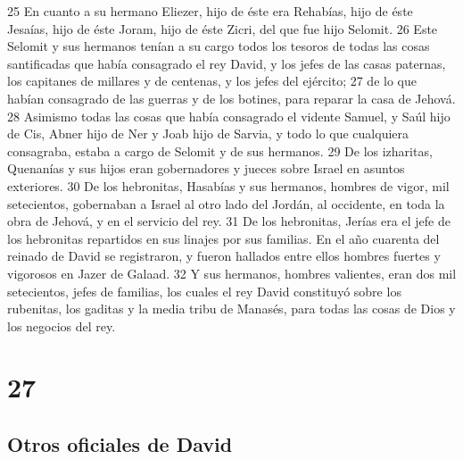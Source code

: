 25 En cuanto a su hermano Eliezer, hijo de éste era Rehabías, hijo de éste Jesaías, hijo de éste Joram, hijo de éste Zicri, del que fue hijo Selomit.
26 Este Selomit y sus hermanos tenían a su cargo todos los tesoros de todas las cosas santificadas que había consagrado el rey David, y los jefes de las casas paternas, los capitanes de millares y de centenas, y los jefes del ejército;
27 de lo que habían consagrado de las guerras y de los botines, para reparar la casa de Jehová.
28 Asimismo todas las cosas que había consagrado el vidente Samuel, y Saúl hijo de Cis, Abner hijo de Ner y Joab hijo de Sarvia, y todo lo que cualquiera consagraba, estaba a cargo de Selomit y de sus hermanos.
29 De los izharitas, Quenanías y sus hijos eran gobernadores y jueces sobre Israel en asuntos exteriores.
30 De los hebronitas, Hasabías y sus hermanos, hombres de vigor, mil setecientos, gobernaban a Israel al otro lado del Jordán, al occidente, en toda la obra de Jehová, y en el servicio del rey.
31 De los hebronitas, Jerías era el jefe de los hebronitas repartidos en sus linajes por sus familias. En el año cuarenta del reinado de David se registraron, y fueron hallados entre ellos hombres fuertes y vigorosos en Jazer de Galaad.
32 Y sus hermanos, hombres valientes, eran dos mil setecientos, jefes de familias, los cuales el rey David constituyó sobre los rubenitas, los gaditas y la media tribu de Manasés, para todas las cosas de Dios y los negocios del rey.

\chapter{27}

\section*{Otros oficiales de David}


